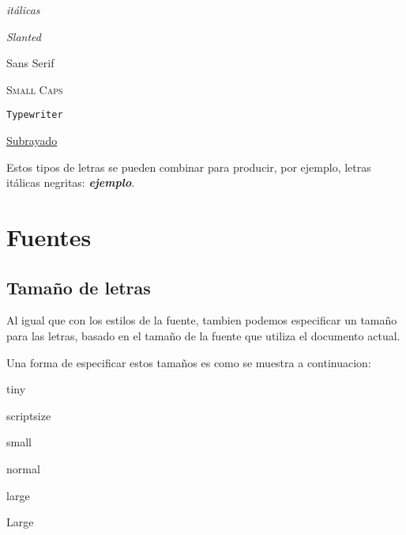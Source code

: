 \documentclass[letterpaper,12pt]{book}
\begin{document}
\medskip

\textit{itálicas}

\bigskip

\textsl{Slanted}

\smallskip

\textsf{Sans Serif}

\smallskip

\textsc{Small Caps}

\smallskip

\texttt{Typewriter}

\underline{Subrayado}

Estos tipos de letras se pueden combinar para producir, por ejemplo, letras itálicas negritas: \textbf{\textit{ejemplo}}.

\part{Fuentes}
\chapter{Tamaño de letras}

Al igual que con los estilos de la fuente, tambien podemos especificar un tamaño para las letras, basado en el tamaño de la fuente que utiliza el documento actual.

Una forma de especificar estos tamaños es como se muestra a continuacion:

{\tiny tiny} %

{\scriptsize scriptsize}

{\small small}

{\normalsize normal}

{\large large}

{\Large Large}
\end{document}

